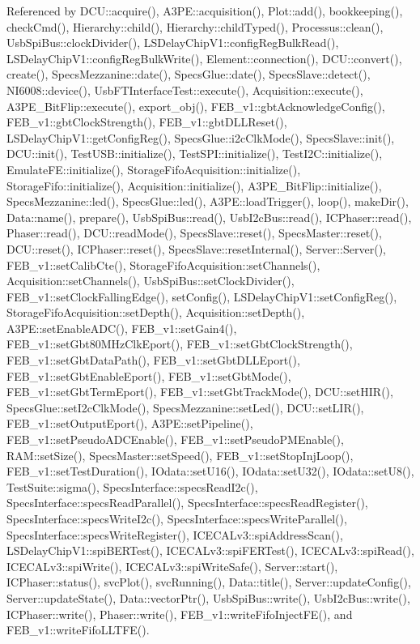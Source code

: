 Referenced by DCU::acquire(), A3PE::acquisition(), Plot::add(), bookkeeping(), checkCmd(), Hierarchy::child(), Hierarchy::childTyped(), Processus::clean(), UsbSpiBus::clockDivider(), LSDelayChipV1::configRegBulkRead(), LSDelayChipV1::configRegBulkWrite(), Element::connection(), DCU::convert(), create(), SpecsMezzanine::date(), SpecsGlue::date(), SpecsSlave::detect(), NI6008::device(), UsbFTInterfaceTest::execute(), Acquisition::execute(), A3PE\_\-BitFlip::execute(), export\_\-obj(), FEB\_\-v1::gbtAcknowledgeConfig(), FEB\_\-v1::gbtClockStrength(), FEB\_\-v1::gbtDLLReset(), LSDelayChipV1::getConfigReg(), SpecsGlue::i2cClkMode(), SpecsSlave::init(), DCU::init(), TestUSB::initialize(), TestSPI::initialize(), TestI2C::initialize(), EmulateFE::initialize(), StorageFifoAcquisition::initialize(), StorageFifo::initialize(), Acquisition::initialize(), A3PE\_\-BitFlip::initialize(), SpecsMezzanine::led(), SpecsGlue::led(), A3PE::loadTrigger(), loop(), makeDir(), Data::name(), prepare(), UsbSpiBus::read(), UsbI2cBus::read(), ICPhaser::read(), Phaser::read(), DCU::readMode(), SpecsSlave::reset(), SpecsMaster::reset(), DCU::reset(), ICPhaser::reset(), SpecsSlave::resetInternal(), Server::Server(), FEB\_\-v1::setCalibCte(), StorageFifoAcquisition::setChannels(), Acquisition::setChannels(), UsbSpiBus::setClockDivider(), FEB\_\-v1::setClockFallingEdge(), setConfig(), LSDelayChipV1::setConfigReg(), StorageFifoAcquisition::setDepth(), Acquisition::setDepth(), A3PE::setEnableADC(), FEB\_\-v1::setGain4(), FEB\_\-v1::setGbt80MHzClkEport(), FEB\_\-v1::setGbtClockStrength(), FEB\_\-v1::setGbtDataPath(), FEB\_\-v1::setGbtDLLEport(), FEB\_\-v1::setGbtEnableEport(), FEB\_\-v1::setGbtMode(), FEB\_\-v1::setGbtTermEport(), FEB\_\-v1::setGbtTrackMode(), DCU::setHIR(), SpecsGlue::setI2cClkMode(), SpecsMezzanine::setLed(), DCU::setLIR(), FEB\_\-v1::setOutputEport(), A3PE::setPipeline(), FEB\_\-v1::setPseudoADCEnable(), FEB\_\-v1::setPseudoPMEnable(), RAM::setSize(), SpecsMaster::setSpeed(), FEB\_\-v1::setStopInjLoop(), FEB\_\-v1::setTestDuration(), IOdata::setU16(), IOdata::setU32(), IOdata::setU8(), TestSuite::sigma(), SpecsInterface::specsReadI2c(), SpecsInterface::specsReadParallel(), SpecsInterface::specsReadRegister(), SpecsInterface::specsWriteI2c(), SpecsInterface::specsWriteParallel(), SpecsInterface::specsWriteRegister(), ICECALv3::spiAddressScan(), LSDelayChipV1::spiBERTest(), ICECALv3::spiFERTest(), ICECALv3::spiRead(), ICECALv3::spiWrite(), ICECALv3::spiWriteSafe(), Server::start(), ICPhaser::status(), svcPlot(), svcRunning(), Data::title(), Server::updateConfig(), Server::updateState(), Data::vectorPtr(), UsbSpiBus::write(), UsbI2cBus::write(), ICPhaser::write(), Phaser::write(), FEB\_\-v1::writeFifoInjectFE(), and FEB\_\-v1::writeFifoLLTFE().


